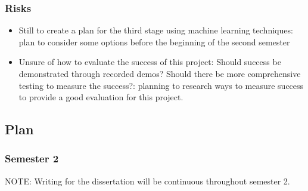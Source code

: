 \documentclass[11pt]{article}
\begin{document}
\subsubsection{Risks}\label{risks}

\begin{itemize}
\item Still to create a plan for the third stage using machine learning techniques:
plan to consider some options before the beginning of the second semester 
\item Unsure of how to evaluate the success of this project: Should success be 
demonstrated through recorded demos? Should there be more comprehensive testing to 
measure the success?: planning to research ways to measure success to provide a 
good evaluation for this project.
\end{itemize}

\subsection{Plan}\label{plan}

\subsubsection{Semester 2}

NOTE: Writing for the dissertation will be continuous throughout semester 2.
\end{document}
